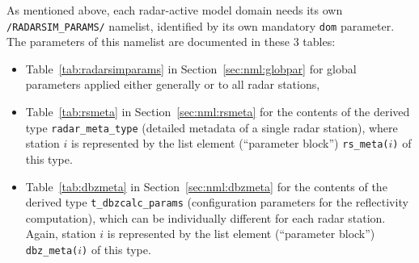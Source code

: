 \documentclass[10pt,a4paper,twoside,headinclude,footinclude,parskip=half]{scrartcl}
\newcommand{\srcform}[1]{\mbox{\texttt{#1}}\xspace}%
\begin{document}
As mentioned above, each radar-active model domain needs its own \srcform{/RADARSIM_PARAMS/} namelist, identified
by its own mandatory \srcform{dom} parameter. The parameters of this namelist are documented in these 3 tables:
\begin{itemize}
\item Table~\ref{tab:radarsimparams} in Section~\ref{sec:nml:globpar} for global parameters applied either generally or to all radar stations,
\item Table~\ref{tab:rsmeta} in Section~\ref{sec:nml:rsmeta} for the contents of the derived type \srcform{radar_meta_type} (detailed metadata of a single radar station), where station $i$ is represented by the list element (``parameter block'') \srcform{rs_meta($i$)} of this type.
\item Table~\ref{tab:dbzmeta} in Section~\ref{sec:nml:dbzmeta} for the contents of the derived type \srcform{t_dbzcalc_params} (configuration parameters for the reflectivity computation), which can be individually different for each radar station. Again, station $i$ is represented by the list element (``parameter block'') \srcform{dbz_meta($i$)} of this type.
\end{itemize}
\end{document}
